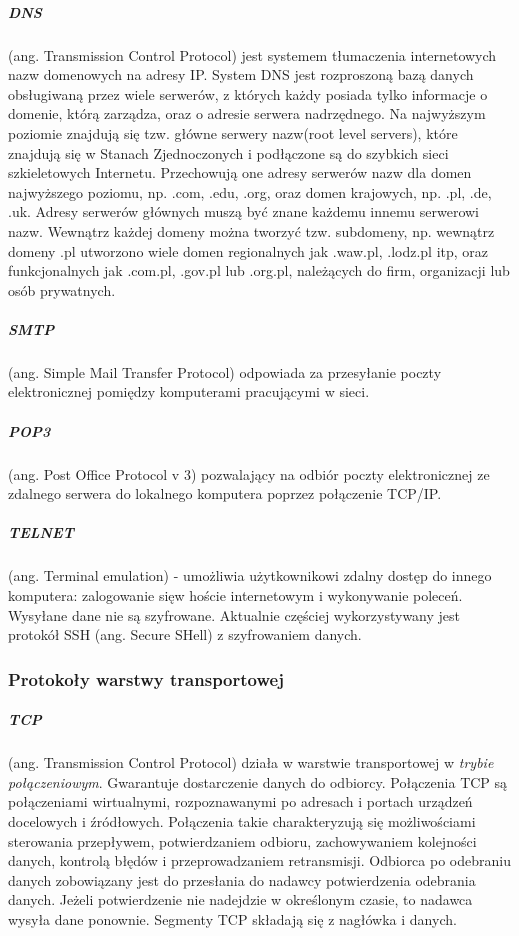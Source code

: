 \documentclass[]{report}
\begin{document}
\subparagraph{DNS} (ang. Transmission   Control   Protocol) jest systemem tłumaczenia internetowych nazw domenowych na adresy IP. 
System  DNS  jest  rozproszoną  bazą  danych obsługiwaną przez wiele serwerów, z których każdy posiada tylko informacje o domenie, którą zarządza, oraz o adresie serwera nadrzędnego. Na najwyższym poziomie znajdują się tzw. główne serwery nazw(root  level  servers),  które  znajdują  się  w  Stanach  Zjednoczonych  i  podłączone  są  do  szybkich  sieci szkieletowych Internetu. Przechowują one adresy serwerów nazw dla domen najwyższego poziomu, np. .com, .edu, .org, oraz domen krajowych, np. .pl, .de, .uk. Adresy serwerów głównych muszą być znane każdemu  innemu  serwerowi  nazw.  Wewnątrz  każdej  domeny  można  tworzyć  tzw.  subdomeny,  np. wewnątrz domeny .pl utworzono wiele domen regionalnych jak .waw.pl, .lodz.pl itp, oraz funkcjonalnych jak .com.pl, .gov.pl lub .org.pl, należących do firm, organizacji lub osób prywatnych. 

\subparagraph{SMTP} (ang. Simple Mail Transfer Protocol) odpowiada za przesyłanie poczty elektronicznej pomiędzy komputerami pracującymi w sieci.

\subparagraph{POP3} (ang. Post Office Protocol v 3) pozwalający na odbiór poczty elektronicznej ze zdalnego serwera do lokalnego komputera poprzez połączenie TCP/IP. 

\subparagraph{TELNET} (ang. Terminal emulation) - umożliwia użytkownikowi zdalny dostęp do innego komputera: zalogowanie sięw hoście internetowym i wykonywanie poleceń. Wysyłane dane nie są szyfrowane. Aktualnie częściej wykorzystywany jest protokół SSH (ang. Secure SHell) z szyfrowaniem danych.



\subsubsection{Protokoły warstwy transportowej}

\medskip 
\subparagraph{TCP} (ang. Transmission   Control   Protocol)   działa   w   warstwie transportowej   w   \emph{trybie połączeniowym}.  Gwarantuje dostarczenie danych do odbiorcy.  Połączenia  TCP  są  połączeniami  wirtualnymi,  rozpoznawanymi  po  adresach  i portach urządzeń  docelowych  i źródłowych.  Połączenia  takie  charakteryzują  się  możliwościami  sterowania przepływem,    potwierdzaniem    odbioru,    zachowywaniem    kolejności    danych,    kontrolą    błędów    i przeprowadzaniem  retransmisji. Odbiorca po odebraniu danych zobowiązany jest do przesłania do nadawcy potwierdzenia odebrania danych. Jeżeli potwierdzenie nie nadejdzie w określonym czasie, to nadawca wysyła dane ponownie.  Segmenty  TCP  składają  się  z  nagłówka  i  danych.
\end{document}
